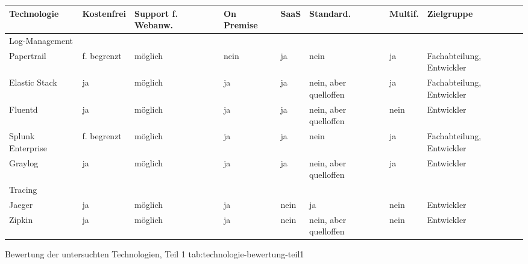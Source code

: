 %
{
\begin{tabular}{|p{2.25cm}|p{2.0cm}|p{2.0cm}|p{2.0cm}|p{1.5cm}|p{2.0cm}|p{1.5cm}|p{2.5cm}|}
\hline
Technologie & Kostenfrei & Support f. Webanw. & On Premise & SaaS & Standard. & Multif. & Zielgruppe \\
\hline
\hline
\multicolumn{7}{|p{15.75cm}|}{Log-Management} \\
\hline
Papertrail & f. begrenzt & möglich & nein & ja & nein & ja & Fachabteilung, Entwickler \\
\hline
Elastic Stack & ja & möglich & ja & ja & nein, aber quelloffen & ja & Fachabteilung, Entwickler \\
\hline
Fluentd & ja & möglich & ja & ja & nein, aber quelloffen & nein & Entwickler \\
\hline
Splunk \mbox{Enterprise} & f. begrenzt & möglich & ja & ja & nein & ja & Fachabteilung, Entwickler \\
\hline
Graylog & ja & möglich & ja & ja & nein, aber quelloffen & ja & Entwickler \\
\hline
\hline
\multicolumn{7}{|p{15.75cm}|}{Tracing} \\
\hline
Jaeger & ja & möglich & ja & nein & ja & nein & Entwickler \\
\hline
Zipkin & ja & möglich & ja & nein & nein, aber quelloffen & nein & Entwickler \\
\hline
\end{tabular}
}
{Bewertung der untersuchten Technologien, Teil 1}
{tab:technologie-bewertung-teil1}

